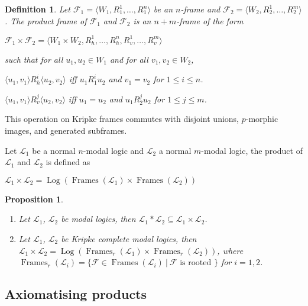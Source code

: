 \documentclass[a4paper]{article}
\theoremstyle{defin}
\newtheorem{defin}{Definition}
\theoremstyle{theorem}
\theoremstyle{prop}
\newtheorem{prop}{Proposition}
\theoremstyle{lemma}
\theoremstyle{ex}
\theoremstyle{col}
\begin{document}
\begin{defin} Let $\mathcal{F}_1 = \langle W_1, R_1^1, \dots, R_1^n\rangle$ be an $n$-frame and $\mathcal{F}_2 = \langle W_2, R_2^1, \dots, R_2^m\rangle$.
The product frame of $\mathcal{F}_1$ and $\mathcal{F}_2$ is an $n+m$-frame of the form
\begin{center}
$\mathcal{F}_1 \times \mathcal{F}_2 = \langle W_1 \times W_2, R_h^1, \dots, R_h^n, R_v^1, \dots, R_v^m \rangle$
\end{center}
such that for all $u_1, u_2 \in W_1$ and for all $v_1, v_2 \in W_2$,
\begin{center}
  $\langle u_1, v_1 \rangle R^i_h \langle u_2, v_2 \rangle$ iff $u_1 R_1^i u_2$ and $v_1 = v_2$ for
  $1 \leq i \leq n$.

  $\langle u_1, v_1 \rangle R^j_v \langle u_2, v_2 \rangle$ iff $u_1 = u_2$ and $u_1 R_2^j u_2$ for $1 \leq j \leq m$.
\end{center}
\end{defin}
This operation on Kripke frames commutes with disjoint unions, $p$-morphic images, and generated subframes.

Let $\mathcal{L}_1$ be a normal $n$-modal logic and $\mathcal{L}_2$ a normal $m$-modal logic, the product of $\mathcal{L}_1$ and $\mathcal{L}_2$ is defined as

\begin{center}
  $\mathcal{L}_1 \times \mathcal{L}_2 = \operatorname{Log}(\operatorname{Frames}(\mathcal{L}_1 ) \times \operatorname{Frames}(\mathcal{L}_2))$
\end{center}

\begin{prop}
  $ $

  \begin{enumerate}
    \item Let $\mathcal{L}_1$, $\mathcal{L}_2$ be modal logics, then $\mathcal{L}_1 * \mathcal{L}_2 \subseteq \mathcal{L}_1 \times \mathcal{L}_2$.
    \item Let $\mathcal{L}_1$, $\mathcal{L}_2$ be Kripke complete modal logics, then $\mathcal{L}_1 \times \mathcal{L}_2 = \operatorname{Log}(\operatorname{Frames}_r(\mathcal{L}_1) \times \operatorname{Frames}_r(\mathcal{L}_2))$, where $\operatorname{Frames}_r(\mathcal{L}_i) = \{\mathcal{F} \in \operatorname{Frames}(\mathcal{L}_i) \: | \: \mathcal{F} \text{ is rooted }\}$ for $i = 1,2$.
  \end{enumerate}
\end{prop}

\subsection{Axiomatising products}
\end{document}
